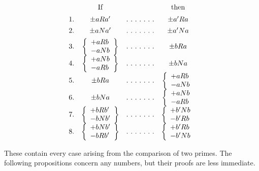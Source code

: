 \[
\begin{array}{rccc}&\text{If}&&\text{then}\\[5pt]
1.&\pm aRa'&\mathinner{.\ .\ .\ .\ .\ .\ .}&\pm a' Ra\\[4pt]
2.&\pm aNa'&\mathinner{.\ .\ .\ .\ .\ .\ .}&\pm a' Na\\[4pt]
3.&\left\{\begin{array}{l}+aRb\\-aNb\end{array}\right\}&\mathinner{.\ .\ .\ .\ .\ .\ .}&\pm bRa\\[4pt]
4.&\left\{\begin{array}{l}+aNb\\-aRb\end{array}\right\}&\mathinner{.\ .\ .\ .\ .\ .\ .}&\pm bNa\\[4pt]
5.&\pm bRa&\mathinner{.\ .\ .\ .\ .\ .\ .}&\left\{\begin{array}{l}+aRb\\-aNb\end{array}\right.\\[4pt]
6.&\pm bNa&\mathinner{.\ .\ .\ .\ .\ .\ .}&\left\{\begin{array}{l}+aNb\\-aRb\end{array}\right.\\[4pt]
7.&\left\{\begin{array}{l}+bRb'\\-bNb'\end{array}\right\}&\mathinner{.\ .\ .\ .\ .\ .\ .}&\left\{\begin{array}{l}+b' Nb\\-b' Rb\end{array}\right.\\[4pt]
8.&\left\{\begin{array}{l}+bNb'\\-bRb'\end{array}\right\}&\mathinner{.\ .\ .\ .\ .\ .\ .}&\left\{\begin{array}{l}+b' Rb\\-b' Nb\end{array}\right.\\[4pt]
\end{array}
\]

These contain every case arising from the comparison of two primes. The following propositions concern any numbers, but their proofs are less immediate.

